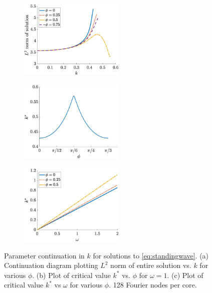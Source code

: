 \documentclass[11pt,reqno]{amsart}
\begin{document}
\begin{figure}
    \centering
    \begin{subfigure}{0.3\linewidth}
        \caption{}
        \label{fig:kcont2a}
        \includegraphics[width=5cm]{contkL2norm.eps}
    \end{subfigure}
    \begin{subfigure}{0.3\linewidth}
        \caption{}
        \label{fig:kcont2b}
        \includegraphics[width=5cm]{contkstarvsphi.eps}
    \end{subfigure}
    \begin{subfigure}{0.3\linewidth}
        \caption{}
        \label{fig:kcont2c}
        \includegraphics[width=5cm]{contkstarvsomega.eps}
    \end{subfigure}
    \caption{Parameter continuation in $k$ for solutions to \cref{eq:standingwave}. (a) Continuation diagram plotting $L^2$ norm of entire solution vs. $k$ for various $\phi$. (b) Plot of critical value $k^*$ vs. $\phi$ for $\omega = 1$. (c) Plot of critical value $k^*$ vs $\omega$ for various $\phi$. 128 Fourier nodes per core.}
    \label{fig:kcont2}
\end{figure}
\end{document}
